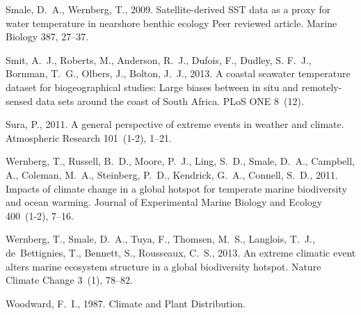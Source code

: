 \documentclass[a4paper,10pt,review]{elsarticle}
\begin{document}
\begin{thebibliography}{52}
Smale, D.~A., Wernberg, T., 2009. {Satellite-derived SST data as a proxy for
  water temperature in nearshore benthic ecology Peer reviewed article}. Marine
  Biology 387, 27--37.

Smit, A.~J., Roberts, M., Anderson, R.~J., Dufois, F., Dudley, S. F.~J.,
  Bornman, T.~G., Olbers, J., Bolton, J.~J., 2013. {A coastal seawater
  temperature dataset for biogeographical studies: Large biases between in situ
  and remotely-sensed data sets around the coast of South Africa}. PLoS ONE
  8~(12).

Sura, P., 2011. {A general perspective of extreme events in weather and
  climate}. Atmospheric Research 101~(1-2), 1--21.

Wernberg, T., Russell, B.~D., Moore, P.~J., Ling, S.~D., Smale, D.~A.,
  Campbell, A., Coleman, M.~A., Steinberg, P.~D., Kendrick, G.~A., Connell,
  S.~D., 2011. {Impacts of climate change in a global hotspot for temperate
  marine biodiversity and ocean warming}. Journal of Experimental Marine
  Biology and Ecology 400~(1-2), 7--16.

Wernberg, T., Smale, D.~A., Tuya, F., Thomsen, M.~S., Langlois, T.~J.,
  de~Bettignies, T., Bennett, S., Rousseaux, C.~S., 2013. {An extreme climatic
  event alters marine ecosystem structure in a global biodiversity hotspot}.
  Nature Climate Change 3~(1), 78--82.

Woodward, F.~I., 1987. {Climate and Plant Distribution}.

\end{thebibliography}
\end{document}

